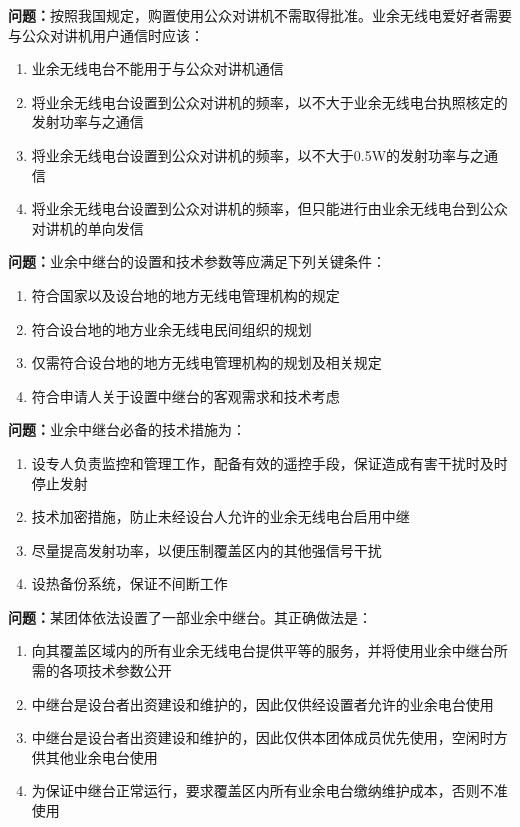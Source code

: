 \bigskip


\noindent\textbf{问题：}按照我国规定，购置使用公众对讲机不需取得批准。业余无线电爱好者需要与公众对讲机用户通信时应该：
\begin{enumerate}[label=\Alph*), leftmargin=3em]
\item 业余无线电台不能用于与公众对讲机通信
\item 将业余无线电台设置到公众对讲机的频率，以不大于业余无线电台执照核定的发射功率与之通信
\item 将业余无线电台设置到公众对讲机的频率，以不大于0.5W的发射功率与之通信
\item 将业余无线电台设置到公众对讲机的频率，但只能进行由业余无线电台到公众对讲机的单向发信
\end{enumerate}

\bigskip


\noindent\textbf{问题：}业余中继台的设置和技术参数等应满足下列关键条件：
\begin{enumerate}[label=\Alph*), leftmargin=3em]
\item 符合国家以及设台地的地方无线电管理机构的规定
\item 符合设台地的地方业余无线电民间组织的规划
\item 仅需符合设台地的地方无线电管理机构的规划及相关规定
\item 符合申请人关于设置中继台的客观需求和技术考虑
\end{enumerate}

\bigskip


\noindent\textbf{问题：}业余中继台必备的技术措施为：
\begin{enumerate}[label=\Alph*), leftmargin=3em]
\item 设专人负责监控和管理工作，配备有效的遥控手段，保证造成有害干扰时及时停止发射
\item 技术加密措施，防止未经设台人允许的业余无线电台启用中继
\item 尽量提高发射功率，以便压制覆盖区内的其他强信号干扰
\item 设热备份系统，保证不间断工作
\end{enumerate}

\bigskip


\noindent\textbf{问题：}某团体依法设置了一部业余中继台。其正确做法是：
\begin{enumerate}[label=\Alph*), leftmargin=3em]
\item 向其覆盖区域内的所有业余无线电台提供平等的服务，并将使用业余中继台所需的各项技术参数公开
\item 中继台是设台者出资建设和维护的，因此仅供经设置者允许的业余电台使用
\item 中继台是设台者出资建设和维护的，因此仅供本团体成员优先使用，空闲时方供其他业余电台使用
\item 为保证中继台正常运行，要求覆盖区内所有业余电台缴纳维护成本，否则不准使用
\end{enumerate}

